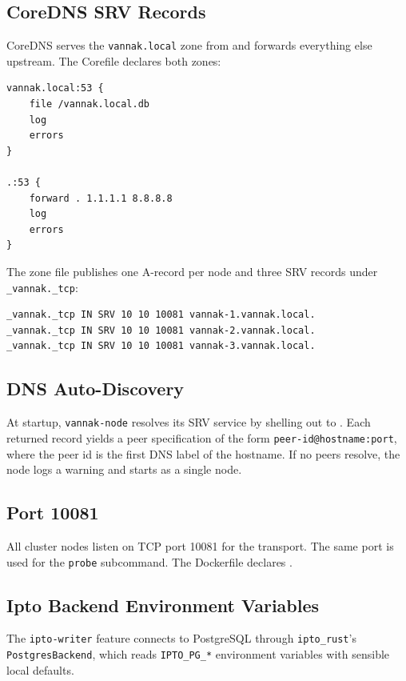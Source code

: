 \subsection{CoreDNS SRV Records}

CoreDNS serves the \texttt{vannak.local} zone from 
and forwards everything else upstream. The Corefile declares both zones:

\begin{lstlisting}[numbers=none]
vannak.local:53 {
    file /vannak.local.db
    log
    errors
}

.:53 {
    forward . 1.1.1.1 8.8.8.8
    log
    errors
}
\end{lstlisting}

The zone file publishes one A-record per node and three SRV records under
\texttt{\_vannak.\_tcp}:

\begin{lstlisting}[numbers=none]
_vannak._tcp IN SRV 10 10 10081 vannak-1.vannak.local.
_vannak._tcp IN SRV 10 10 10081 vannak-2.vannak.local.
_vannak._tcp IN SRV 10 10 10081 vannak-3.vannak.local.
\end{lstlisting}

\subsection{DNS Auto-Discovery}

At startup, \texttt{vannak-node} resolves its SRV service by shelling out to
. Each returned record yields
a peer specification of the form \texttt{peer-id@hostname:port}, where the peer
id is the first DNS label of the hostname. If no peers resolve, the node logs a
warning and starts as a single node.

\subsection{Port 10081}

All cluster nodes listen on TCP port 10081 for the \graft{} transport. The same
port is used for the \texttt{probe} subcommand. The Dockerfile declares
.

\subsection{Ipto Backend Environment Variables}

The \texttt{ipto-writer} feature connects to PostgreSQL through
\texttt{ipto\_rust}'s \texttt{PostgresBackend}, which reads \texttt{IPTO\_PG\_*}
environment variables with sensible local defaults.

